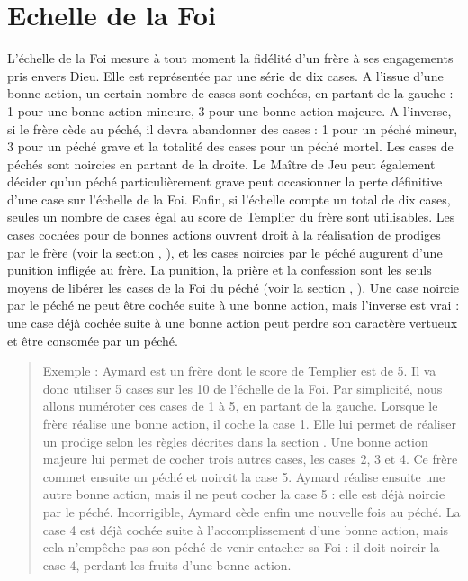 \section{Echelle de la Foi}\label{sec:echellefoi}
L'échelle de la Foi mesure à tout moment la fidélité d'un frère à ses engagements pris envers Dieu. Elle est représentée par une série de dix cases. A l'issue d'une bonne action, un certain nombre de cases sont cochées, en partant de la gauche : 1 pour une bonne action mineure, 3 pour une bonne action majeure. A l'inverse, si le frère cède au péché, il devra abandonner des cases : 1 pour un péché mineur, 3 pour un péché grave et la totalité des cases pour un péché mortel. Les cases de péchés sont noircies en partant de la droite. Le Maître de Jeu peut également décider qu'un péché particulièrement grave peut occasionner la perte définitive d'une case sur l'échelle de la Foi. Enfin, si l'échelle compte un total de dix cases, seules un nombre de cases égal au score de Templier du frère sont utilisables. Les cases cochées pour de bonnes actions ouvrent droit à la réalisation de prodiges par le frère (voir la section , ), et les cases noircies par le péché augurent d'une punition infligée au frère. La punition, la prière et la confession sont les seuls moyens de libérer les cases de la Foi du péché (voir la section , ). Une case noircie par le péché ne peut être cochée suite à une bonne action, mais l'inverse est vrai : une case déjà cochée suite à une bonne action peut perdre son caractère vertueux et être consomée par un péché.

\begin{quotation}
Exemple : Aymard est un frère dont le score de Templier est de 5. Il va donc utiliser 5 cases sur les 10 de l'échelle de la Foi. Par simplicité, nous allons numéroter ces cases de 1 à 5, en partant de la gauche. Lorsque le frère réalise une bonne action, il coche la case 1. Elle lui permet de réaliser un prodige selon les règles décrites dans la section . Une bonne action majeure lui permet de cocher trois autres cases, les cases 2, 3 et 4. Ce frère commet ensuite un péché et noircit la case 5. Aymard réalise ensuite une autre bonne action, mais il ne peut cocher la case 5 : elle est déjà noircie par le péché. Incorrigible, Aymard cède enfin une nouvelle fois au péché. La case 4 est déjà cochée suite à l'accomplissement d'une bonne action, mais cela n'empêche pas son péché de venir entacher sa Foi : il doit noircir la case 4, perdant les fruits d'une bonne action.
\end{quotation}

